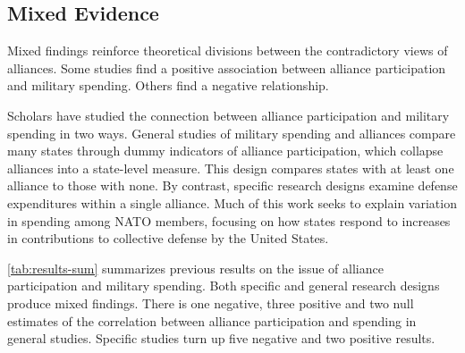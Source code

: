 \documentclass[12pt]{article}
\begin{document}
\subsection{Mixed Evidence} 


Mixed findings reinforce theoretical divisions between the contradictory views of alliances.
Some studies find a positive association between alliance participation and military spending. 
Others find a negative relationship.


Scholars have studied the connection between alliance participation and military spending in two ways. 
General studies of military spending and alliances compare many states through dummy indicators of alliance participation, which collapse alliances into a state-level measure. 
This design compares states with at least one alliance to those with none.
By contrast, specific research designs examine defense expenditures within a single alliance. 
Much of this work seeks to explain variation in spending among NATO members, focusing on how states respond to increases in contributions to collective defense by the United States.


\autoref{tab:results-sum} summarizes previous results on the issue of alliance participation and military spending. 
Both specific and general research designs produce mixed findings. 
There is one negative, three positive and two null estimates of the correlation between alliance participation and spending in general studies. 
Specific studies turn up five negative and two positive results.  
\end{document}
